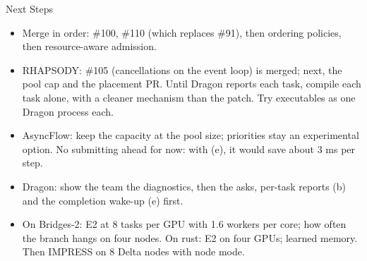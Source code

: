 \documentclass[aspectratio=169, 10pt, t]{beamer}
\begin{document}
\begin{frame}{Next Steps}
\begin{itemize}
  \item Merge in order: \#100, \#110 (which replaces \#91), then ordering policies, then resource-aware admission.
  \item RHAPSODY: \#105 (cancellations on the event loop) is merged; next, the pool cap and the placement PR. Until Dragon reports each task, compile each task alone, with a cleaner mechanism than the patch. Try executables as one Dragon process each.
  \item AsyncFlow: keep the capacity at the pool size; priorities stay an experimental option. No submitting ahead for now: with (e), it would save about 3 ms per step.
  \item Dragon: show the team the diagnostics, then the asks, per-task reports (b) and the completion wake-up (e) first.
  \item On Bridges-2: E2 at 8 tasks per GPU with 1.6 workers per core; how often the branch hangs on four nodes. On rust: E2 on four GPUs; learned memory. Then IMPRESS on 8 Delta nodes with node mode.
\end{itemize}
\end{frame}
\end{document}
